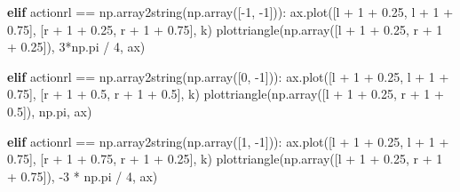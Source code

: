 \documentclass[
]{article}
\newenvironment{Shaded}{\begin{snugshade}}{\end{snugshade}}
\newcommand{\ControlFlowTok}[1]{\textcolor[rgb]{0.00,0.23,0.31}{\textbf{#1}}}
\newcommand{\DecValTok}[1]{\textcolor[rgb]{0.68,0.00,0.00}{#1}}
\newcommand{\FloatTok}[1]{\textcolor[rgb]{0.68,0.00,0.00}{#1}}
\newcommand{\NormalTok}[1]{\textcolor[rgb]{0.00,0.23,0.31}{#1}}
\newcommand{\OperatorTok}[1]{\textcolor[rgb]{0.37,0.37,0.37}{#1}}
\newcommand{\StringTok}[1]{\textcolor[rgb]{0.13,0.47,0.30}{#1}}
\begin{document}
\begin{Shaded}
\begin{Highlighting}[]
                \ControlFlowTok{elif}\NormalTok{ actionrl }\OperatorTok{==}\NormalTok{ np.array2string(np.array([}\OperatorTok{{-}}\DecValTok{1}\NormalTok{, }\OperatorTok{{-}}\DecValTok{1}\NormalTok{])):}
\NormalTok{                    ax.plot([l }\OperatorTok{+} \DecValTok{1} \OperatorTok{+} \FloatTok{0.25}\NormalTok{, l }\OperatorTok{+} \DecValTok{1} \OperatorTok{+} \FloatTok{0.75}\NormalTok{], [r }\OperatorTok{+} \DecValTok{1} \OperatorTok{+} \FloatTok{0.25}\NormalTok{, r }\OperatorTok{+} \DecValTok{1} \OperatorTok{+} \FloatTok{0.75}\NormalTok{], }\StringTok{\textquotesingle{}k\textquotesingle{}}\NormalTok{)}
\NormalTok{                    plottriangle(np.array([l }\OperatorTok{+} \DecValTok{1} \OperatorTok{+} \FloatTok{0.25}\NormalTok{, r }\OperatorTok{+} \DecValTok{1} \OperatorTok{+} \FloatTok{0.25}\NormalTok{]), }\DecValTok{3}\OperatorTok{*}\NormalTok{np.pi }\OperatorTok{/} \DecValTok{4}\NormalTok{, ax)}

                \ControlFlowTok{elif}\NormalTok{ actionrl }\OperatorTok{==}\NormalTok{ np.array2string(np.array([}\DecValTok{0}\NormalTok{, }\OperatorTok{{-}}\DecValTok{1}\NormalTok{])):}
\NormalTok{                    ax.plot([l }\OperatorTok{+} \DecValTok{1} \OperatorTok{+} \FloatTok{0.25}\NormalTok{, l }\OperatorTok{+} \DecValTok{1} \OperatorTok{+} \FloatTok{0.75}\NormalTok{], [r }\OperatorTok{+} \DecValTok{1} \OperatorTok{+} \FloatTok{0.5}\NormalTok{, r }\OperatorTok{+} \DecValTok{1} \OperatorTok{+} \FloatTok{0.5}\NormalTok{], }\StringTok{\textquotesingle{}k\textquotesingle{}}\NormalTok{)}
\NormalTok{                    plottriangle(np.array([l }\OperatorTok{+} \DecValTok{1} \OperatorTok{+} \FloatTok{0.25}\NormalTok{, r }\OperatorTok{+} \DecValTok{1} \OperatorTok{+} \FloatTok{0.5}\NormalTok{]), np.pi, ax)}

                \ControlFlowTok{elif}\NormalTok{ actionrl }\OperatorTok{==}\NormalTok{ np.array2string(np.array([}\DecValTok{1}\NormalTok{, }\OperatorTok{{-}}\DecValTok{1}\NormalTok{])):}
\NormalTok{                    ax.plot([l }\OperatorTok{+} \DecValTok{1} \OperatorTok{+} \FloatTok{0.25}\NormalTok{, l }\OperatorTok{+} \DecValTok{1} \OperatorTok{+} \FloatTok{0.75}\NormalTok{], [r }\OperatorTok{+} \DecValTok{1} \OperatorTok{+} \FloatTok{0.75}\NormalTok{, r }\OperatorTok{+} \DecValTok{1} \OperatorTok{+} \FloatTok{0.25}\NormalTok{], }\StringTok{\textquotesingle{}k\textquotesingle{}}\NormalTok{)}
\NormalTok{                    plottriangle(np.array([l }\OperatorTok{+} \DecValTok{1} \OperatorTok{+} \FloatTok{0.25}\NormalTok{, r }\OperatorTok{+} \DecValTok{1} \OperatorTok{+} \FloatTok{0.75}\NormalTok{]), }\OperatorTok{{-}}\DecValTok{3} \OperatorTok{*}\NormalTok{ np.pi }\OperatorTok{/} \DecValTok{4}\NormalTok{, ax)}


\end{Highlighting}
\end{Shaded}
\end{document}
